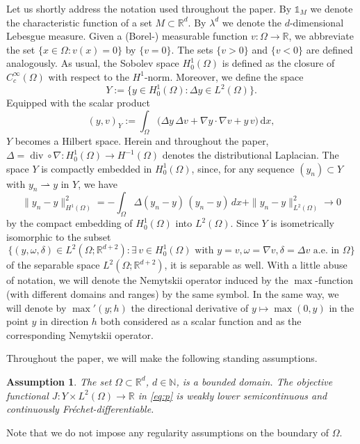 \documentclass[reqno]{shinyart}
\newtheorem{assumption}[theorem]{Assumption}
\begin{document}
Let us shortly address the notation used throughout the paper.
By $\mathbb{1}_M$ we denote the characteristic function of a set $M\subset {\mathbb{R}}^d$. 
By $\lambda^d$ we denote the $d$-dimensional Lebesgue measure.
Given a (Borel-) measurable function $v : \Omega \to {\mathbb{R}}$, we abbreviate the set $\{x\in \Omega: v(x) = 0\}$
by $\{v = 0\}$. The sets $\{v > 0\}$ and $\{v<0\}$ are defined analogously. 
As usual, the Sobolev space $H^1_0(\Omega)$ is defined as the closure of $C_c^\infty(\Omega)$ 
with respect to the $H^1$-norm. Moreover, we define the space
\begin{equation*}
    Y  := \{ y \in H^1_0(\Omega) : \Delta y \in L^2(\Omega) \}.
\end{equation*}
Equipped with the scalar product 
\begin{equation*}
    (y,v)_Y := \int_\Omega \big(\Delta y \, \Delta v + \nabla y \cdot \nabla v + y\,v\big)\, {\mathrm{d}} x,
\end{equation*}
$Y$ becomes a Hilbert space. Herein and throughout the paper, 
$\Delta = {\operatorname{div}} \circ \nabla : H^1_0(\Omega) \to H^{-1}(\Omega)$ denotes the distributional Laplacian. 
The space $Y$ is compactly embedded in $H^1_0(\Omega)$, since, for any sequence 
$(y_n) \subset Y$ with $y_n {\rightharpoonup} y$ in $Y$, we have 
\begin{equation*}
    \|y_n - y\|_{H^1(\Omega)}^2 
    = - \int_\Omega \Delta (y_n-y) \,(y_n - y)\,dx + \|y_n - y\|_{L^2(\Omega)}^2 \to 0
\end{equation*}
by the compact embedding of $H^1_0(\Omega)$ into $L^2(\Omega)$.
Since $Y$ is isometrically isomorphic to the subset 
\begin{equation*}
    \{(y, \omega, \delta) \in L^2(\Omega;{\mathbb{R}}^{d+2}): \exists\, v\in H^1_0(\Omega) \text{ with }
    y = v, \omega = \nabla v, \delta = \Delta v \text{ a.e.\ in }\Omega\}
\end{equation*}
of the separable space $L^2(\Omega;{\mathbb{R}}^{d+2})$, it is separable as well. 
With a little abuse of notation, we will denote the Nemytskii operator 
induced by the $\max$-function (with different domains and ranges) by the same symbol. In the same way, we will denote by $\max'(y;h)$ the directional derivative of $y\mapsto \max(0,y)$ in the point $y$ in direction $h$ both considered as a scalar function and as the corresponding Nemytskii operator.

Throughout the paper, we will make the following standing assumptions.
\begin{assumption}\label{assu:standing}
    The set $\Omega\subset {\mathbb{R}}^d$, $d\in {\mathbb{N}}$, is a bounded domain.
    The objective functional $J: Y \times L^2(\Omega) \to {\mathbb{R}}$ in \eqref{eq:p}
    is weakly lower semicontinuous and continuously Fr\'echet-differentiable.
\end{assumption}
Note that we do not impose any regularity assumptions on the boundary of $\Omega$.
\end{document}

